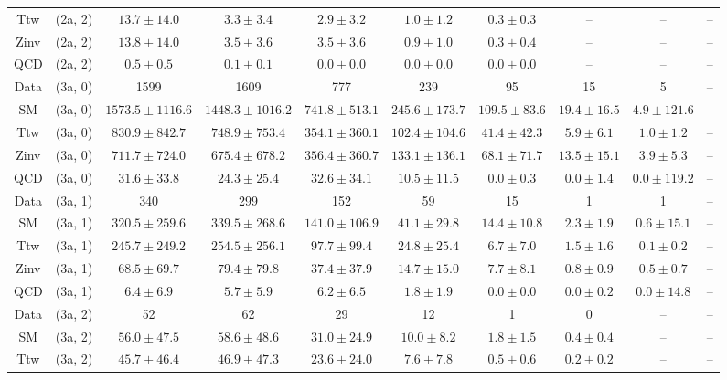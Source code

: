 \begin{table}[h!]
{\begin{tabular}{cccccccccc}
	Ttw & (2a, 2) & $13.7\pm 14.0$ & $3.3\pm 3.4$ & $2.9\pm 3.2$ & $1.0\pm 1.2$ & $0.3\pm 0.3$ & -- & -- & -- \\[0.5ex] 
	Zinv & (2a, 2) & $13.8\pm 14.0$ & $3.5\pm 3.6$ & $3.5\pm 3.6$ & $0.9\pm 1.0$ & $0.3\pm 0.4$ & -- & -- & -- \\[0.5ex] 
	QCD & (2a, 2) & $0.5\pm 0.5$ & $0.1\pm 0.1$ & $0.0\pm 0.0$ & $0.0\pm 0.0$ & $0.0\pm 0.0$ & -- & -- & -- \\[0.5ex] 
	Data & (3a, 0) & 1599 & 1609 & 777 & 239 & 95 & 15 & 5 & -- \\[0.5ex] 
	SM & (3a, 0) & $1573.5\pm 1116.6$ & $1448.3\pm 1016.2$ & $741.8\pm 513.1$ & $245.6\pm 173.7$ & $109.5\pm 83.6$ & $19.4\pm 16.5$ & $4.9\pm 121.6$ & -- \\[0.5ex] 
	Ttw & (3a, 0) & $830.9\pm 842.7$ & $748.9\pm 753.4$ & $354.1\pm 360.1$ & $102.4\pm 104.6$ & $41.4\pm 42.3$ & $5.9\pm 6.1$ & $1.0\pm 1.2$ & -- \\[0.5ex] 
	Zinv & (3a, 0) & $711.7\pm 724.0$ & $675.4\pm 678.2$ & $356.4\pm 360.7$ & $133.1\pm 136.1$ & $68.1\pm 71.7$ & $13.5\pm 15.1$ & $3.9\pm 5.3$ & -- \\[0.5ex] 
	QCD & (3a, 0) & $31.6\pm 33.8$ & $24.3\pm 25.4$ & $32.6\pm 34.1$ & $10.5\pm 11.5$ & $0.0\pm 0.3$ & $0.0\pm 1.4$ & $0.0\pm 119.2$ & -- \\[0.5ex] 
	Data & (3a, 1) & 340 & 299 & 152 & 59 & 15 & 1 & 1 & -- \\[0.5ex] 
	SM & (3a, 1) & $320.5\pm 259.6$ & $339.5\pm 268.6$ & $141.0\pm 106.9$ & $41.1\pm 29.8$ & $14.4\pm 10.8$ & $2.3\pm 1.9$ & $0.6\pm 15.1$ & -- \\[0.5ex] 
	Ttw & (3a, 1) & $245.7\pm 249.2$ & $254.5\pm 256.1$ & $97.7\pm 99.4$ & $24.8\pm 25.4$ & $6.7\pm 7.0$ & $1.5\pm 1.6$ & $0.1\pm 0.2$ & -- \\[0.5ex] 
	Zinv & (3a, 1) & $68.5\pm 69.7$ & $79.4\pm 79.8$ & $37.4\pm 37.9$ & $14.7\pm 15.0$ & $7.7\pm 8.1$ & $0.8\pm 0.9$ & $0.5\pm 0.7$ & -- \\[0.5ex] 
	QCD & (3a, 1) & $6.4\pm 6.9$ & $5.7\pm 5.9$ & $6.2\pm 6.5$ & $1.8\pm 1.9$ & $0.0\pm 0.0$ & $0.0\pm 0.2$ & $0.0\pm 14.8$ & -- \\[0.5ex] 
	Data & (3a, 2) & 52 & 62 & 29 & 12 & 1 & 0 & -- & -- \\[0.5ex] 
	SM & (3a, 2) & $56.0\pm 47.5$ & $58.6\pm 48.6$ & $31.0\pm 24.9$ & $10.0\pm 8.2$ & $1.8\pm 1.5$ & $0.4\pm 0.4$ & -- & -- \\[0.5ex] 
	Ttw & (3a, 2) & $45.7\pm 46.4$ & $46.9\pm 47.3$ & $23.6\pm 24.0$ & $7.6\pm 7.8$ & $0.5\pm 0.6$ & $0.2\pm 0.2$ & -- & -- \\[0.5ex] 

\end{tabular}}
\end{table}
